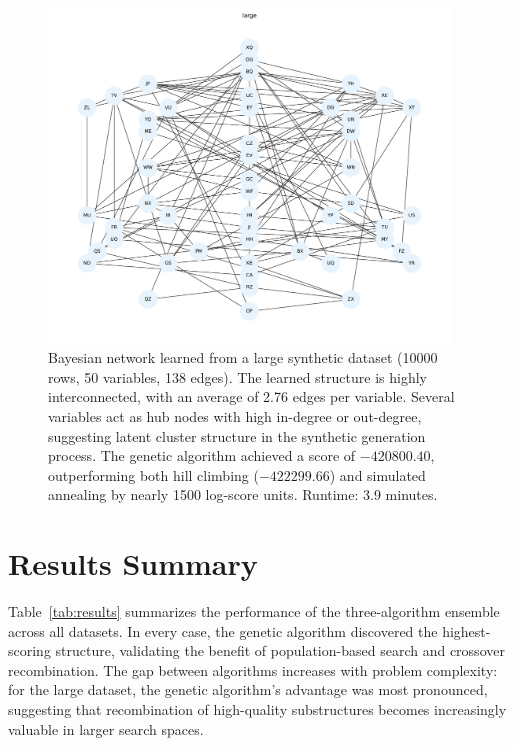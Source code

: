 \documentclass[twoside,11pt]{article}
\begin{document}
\begin{figure}[h]
    \centering
    \includegraphics[width=0.95\textwidth]{large_graph.pdf}
    \caption{Bayesian network learned from a large synthetic dataset (10000 rows, 50 variables, 138 edges). The learned structure is highly interconnected, with an average of 2.76 edges per variable. Several variables act as hub nodes with high in-degree or out-degree, suggesting latent cluster structure in the synthetic generation process. The genetic algorithm achieved a score of $-420800.40$, outperforming both hill climbing ($-422299.66$) and simulated annealing by nearly 1500 log-score units. Runtime: 3.9 minutes.}
\end{figure}


\section{Results Summary}

Table~\ref{tab:results} summarizes the performance of the three-algorithm ensemble across all datasets. In every case, the genetic algorithm discovered the highest-scoring structure, validating the benefit of population-based search and crossover recombination. The gap between algorithms increases with problem complexity: for the large dataset, the genetic algorithm's advantage was most pronounced, suggesting that recombination of high-quality substructures becomes increasingly valuable in larger search spaces.
\end{document}
